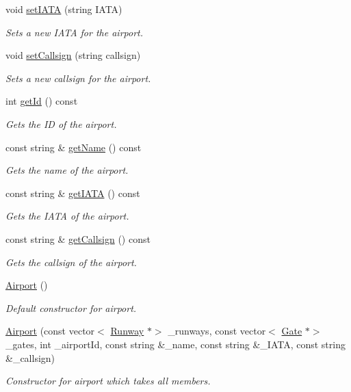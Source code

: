\begin{DoxyCompactItemize}
void \mbox{\hyperlink{class_airport_a9555c51c003f8acb412e07442cb920c8}{set\+I\+A\+TA}} (string I\+A\+TA)
\begin{DoxyCompactList}\small\item\em Sets a new I\+A\+TA for the airport. \end{DoxyCompactList}\item 
void \mbox{\hyperlink{class_airport_a211a2877b1d654a9a50b28f260eec159}{set\+Callsign}} (string callsign)
\begin{DoxyCompactList}\small\item\em Sets a new callsign for the airport. \end{DoxyCompactList}\item 
int \mbox{\hyperlink{class_airport_ab7f1095f9c7bf4940bd5b375fa8a5fc4}{get\+Id}} () const
\begin{DoxyCompactList}\small\item\em Gets the ID of the airport. \end{DoxyCompactList}\item 
const string \& \mbox{\hyperlink{class_airport_aa5be38443c1de176e52c4f5f5252c956}{get\+Name}} () const
\begin{DoxyCompactList}\small\item\em Gets the name of the airport. \end{DoxyCompactList}\item 
const string \& \mbox{\hyperlink{class_airport_aa127b88a8221fa23977c4fa6e37eee5b}{get\+I\+A\+TA}} () const
\begin{DoxyCompactList}\small\item\em Gets the I\+A\+TA of the airport. \end{DoxyCompactList}\item 
const string \& \mbox{\hyperlink{class_airport_a7fd582a5f9554830247f724ddc031d84}{get\+Callsign}} () const
\begin{DoxyCompactList}\small\item\em Gets the callsign of the airport. \end{DoxyCompactList}\item 
\mbox{\hyperlink{class_airport_a2fc0f2402c94225b9deaf76176bb887f}{Airport}} ()
\begin{DoxyCompactList}\small\item\em Default constructor for airport. \end{DoxyCompactList}\item 
\mbox{\hyperlink{class_airport_a153cf00d5a0e7a547da06e3a77da4d8a}{Airport}} (const vector$<$ \mbox{\hyperlink{class_runway}{Runway}} $\ast$$>$ \+\_\+runways, const vector$<$ \mbox{\hyperlink{class_gate}{Gate}} $\ast$$>$ \+\_\+gates, int \+\_\+airport\+Id, const string \&\+\_\+name, const string \&\+\_\+\+I\+A\+TA, const string \&\+\_\+callsign)
\begin{DoxyCompactList}\small\item\em Constructor for airport which takes all members. \end{DoxyCompactList}\end{DoxyCompactItemize}


